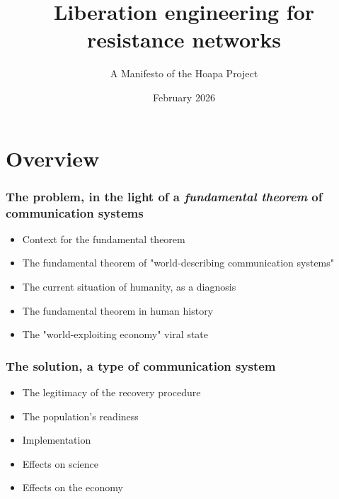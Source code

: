 \documentclass[11pt]{article}
\title{Liberation engineering for resistance networks}
\author{A Manifesto of the Hoapa Project}
\date{February 2026}
\begin{document}
\maketitle

\section*{Overview}

\subsubsection*{The problem, in the light of a \emph{fundamental theorem} of communication systems}

\begin{itemize}

\item Context for the fundamental theorem

\item The fundamental theorem of "world-describing communication systems"

\item The current situation of humanity, as a diagnosis

\item The fundamental theorem in human history

\item The "world-exploiting economy" viral state

\end{itemize}

\subsubsection*{The solution, a type of communication system}

\begin{itemize}

\item The legitimacy of the recovery procedure

\item The population's readiness

\item Implementation

\item Effects on science

\item Effects on the economy

\end{itemize}
\end{document}
